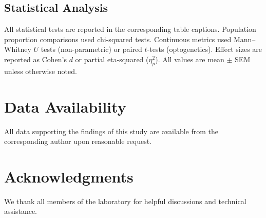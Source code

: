 \documentclass[11pt]{article}
\begin{document}
\subsection{Statistical Analysis}
All statistical tests are reported in the corresponding table captions. Population proportion comparisons used chi-squared tests. Continuous metrics used Mann--Whitney $U$ tests (non-parametric) or paired $t$-tests (optogenetics). Effect sizes are reported as Cohen's $d$ or partial eta-squared ($\eta^2_p$). All values are mean $\pm$ SEM unless otherwise noted.

\section{Data Availability}
All data supporting the findings of this study are available from the corresponding author upon reasonable request.

\section{Acknowledgments}
We thank all members of the laboratory for helpful discussions and technical assistance.



\end{document}
